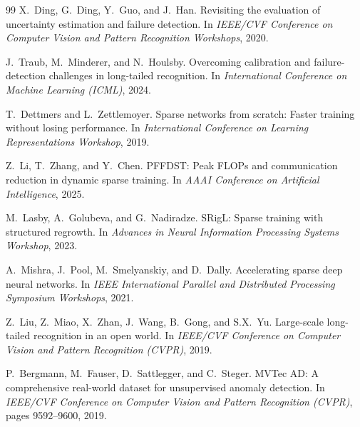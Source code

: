 \documentclass[letterpaper]{article} %
\begin{document}
\begin{thebibliography}{99}
X.~Ding, G.~Ding, Y.~Guo, and J.~Han.
\newblock Revisiting the evaluation of uncertainty estimation and failure detection.
\newblock In {\em IEEE/CVF Conference on Computer Vision and Pattern Recognition Workshops}, 2020.

J.~Traub, M.~Minderer, and N.~Houlsby.
\newblock Overcoming calibration and failure-detection challenges in long-tailed recognition.
\newblock In {\em International Conference on Machine Learning (ICML)}, 2024.

T.~Dettmers and L.~Zettlemoyer.
\newblock Sparse networks from scratch: Faster training without losing performance.
\newblock In {\em International Conference on Learning Representations Workshop}, 2019.

Z.~Li, T.~Zhang, and Y.~Chen.
\newblock PFFDST: Peak FLOPs and communication reduction in dynamic sparse training.
\newblock In {\em AAAI Conference on Artificial Intelligence}, 2025.

M.~Lasby, A.~Golubeva, and G.~Nadiradze.
\newblock SRigL: Sparse training with structured regrowth.
\newblock In {\em Advances in Neural Information Processing Systems Workshop}, 2023.

A.~Mishra, J.~Pool, M.~Smelyanskiy, and D.~Dally.
\newblock Accelerating sparse deep neural networks.
\newblock In {\em IEEE International Parallel and Distributed Processing Symposium Workshops}, 2021.

Z.~Liu, Z.~Miao, X.~Zhan, J.~Wang, B.~Gong, and S.X.~Yu.
\newblock Large-scale long-tailed recognition in an open world.
\newblock In {\em IEEE/CVF Conference on Computer Vision and Pattern Recognition (CVPR)}, 2019.

P.~Bergmann, M.~Fauser, D.~Sattlegger, and C.~Steger.
\newblock MVTec AD: A comprehensive real-world dataset for unsupervised anomaly detection.
\newblock In {\em IEEE/CVF Conference on Computer Vision and Pattern Recognition (CVPR)}, pages 9592--9600, 2019.

\end{thebibliography}
\end{document}
